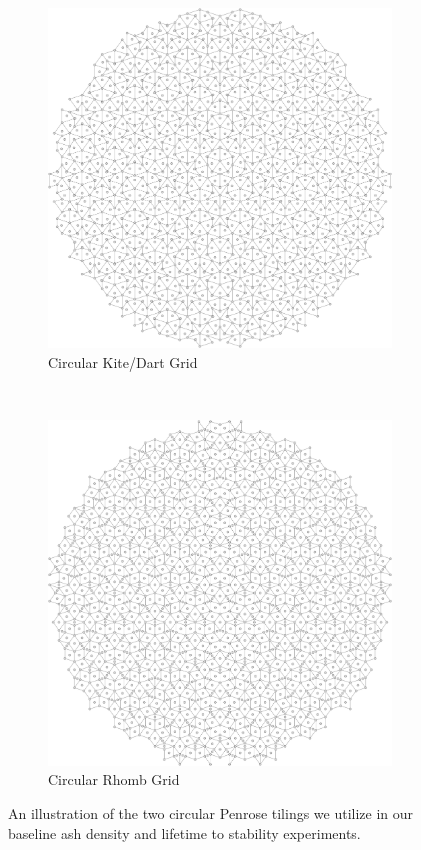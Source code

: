 \documentclass[a4paper,11pt]{report}
\begin{document}
\begin{figure}[htp]
\centering
\begin{subfigure}[t]{0.6\textwidth}
	\centering
	\includegraphics[width=\textwidth]{ch4_figs/ckd}
	\caption{Circular Kite/Dart Grid}
	\label{fig:kd_circ}
\end{subfigure}
~
\begin{subfigure}[t]{0.6\textwidth}
	\centering
	\includegraphics[width=\textwidth]{ch4_figs/crh}
	\caption{Circular Rhomb Grid}
	\label{fig:tt_circ}
\end{subfigure}

\caption[Circular Penrose Tilings]{
	An illustration of the two circular Penrose tilings we utilize in our baseline ash density and lifetime to stability experiments.
}
\label{fig:penrose_circ}
\end{figure}
\end{document}

